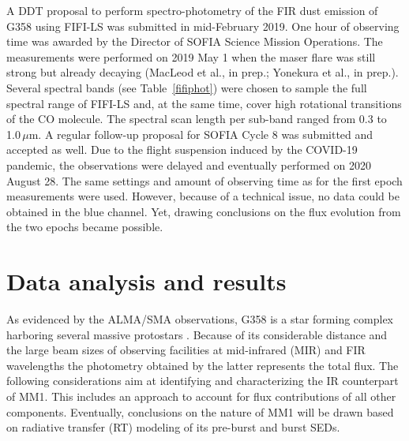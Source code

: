 A DDT proposal to perform spectro-photometry of the FIR dust emission of G358 using FIFI-LS was submitted in mid-February 2019.
One hour of observing time was awarded 
by the Director of SOFIA Science Mission Operations. The measurements were performed on 2019 May 1 when the maser flare was still strong but already decaying (MacLeod et al., in prep.; Yonekura et al., in prep.). Several spectral bands (see Table \,\ref{fifiphot}) were chosen to sample the full spectral range of FIFI-LS and, at the same time, cover high rotational transitions of the CO molecule. The spectral scan length per sub-band ranged from 0.3 to 1.0\,$\mu$m.
A regular follow-up proposal for SOFIA Cycle 8 was submitted and accepted as well. 
Due to the flight suspension induced by the COVID-19 pandemic, the observations were delayed and eventually %
performed on 2020 August 28. The same settings and amount of observing time as for the first epoch measurements were used. However, because of a technical issue, no data could be obtained in the blue channel. Yet, 
drawing conclusions on the flux evolution from the two epochs became possible.


\section{Data analysis and results}\label{res}

As evidenced by the ALMA/SMA observations, G358 is a star forming complex harboring several massive protostars \citep{2019ApJ...881L..39B}. Because of its considerable distance and the large beam sizes of observing facilities at mid-infrared (MIR) and FIR wavelengths the photometry obtained by the latter represents the total flux. The following 
considerations aim at identifying and characterizing the IR counterpart of MM1. This includes an approach to account for flux contributions of all other components. Eventually, conclusions on the nature of MM1 will be drawn based on radiative transfer (RT) modeling of its pre-burst and burst SEDs.

